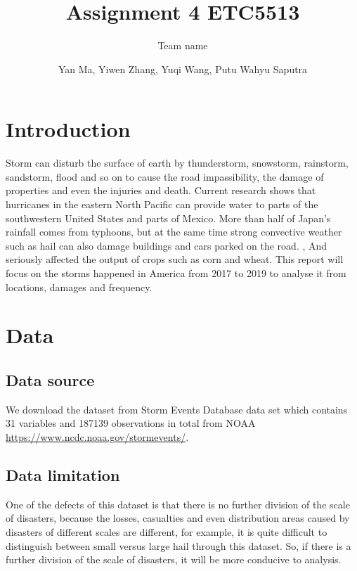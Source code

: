 \documentclass[
]{article}
\title{Assignment 4 ETC5513}
\subtitle{Team name}
\author{Yan Ma, Yiwen Zhang, Yuqi Wang, Putu Wahyu Saputra}
\date{}
\begin{document}
\maketitle

{
\setcounter{tocdepth}{2}
\tableofcontents
}
\clearpage

\hypertarget{introduction}{%
\section{Introduction}\label{introduction}}

Storm can disturb the surface of earth by thunderstorm, snowstorm, rainstorm, sandstorm, flood and so on to cause the road impassibility, the damage of properties and even the injuries and death. Current research shows that hurricanes in the eastern North Pacific can provide water to parts of the southwestern United States and parts of Mexico. More than half of Japan's rainfall comes from typhoons, but at the same time strong convective weather such as hail can also damage buildings and cars parked on the road. , And seriously affected the output of crops such as corn and wheat. This report will focus on the storms happened in America from 2017 to 2019 to analyse it from locations, damages and frequency.

\hypertarget{data}{%
\section{Data}\label{data}}

\hypertarget{data-source}{%
\subsection{Data source}\label{data-source}}

We download the dataset from Storm Events Database data set which contains 31 variables and 187139 observations in total from NOAA \url{https://www.ncdc.noaa.gov/stormevents/}.

\hypertarget{data-limitation}{%
\subsection{Data limitation}\label{data-limitation}}

One of the defects of this dataset is that there is no further division of the scale of disasters, because the losses, casualties and even distribution areas caused by disasters of different scales are different, for example, it is quite difficult to distinguish between small versus large hail through this dataset. So, if there is a further division of the scale of disasters, it will be more conducive to analysis.
\end{document}
